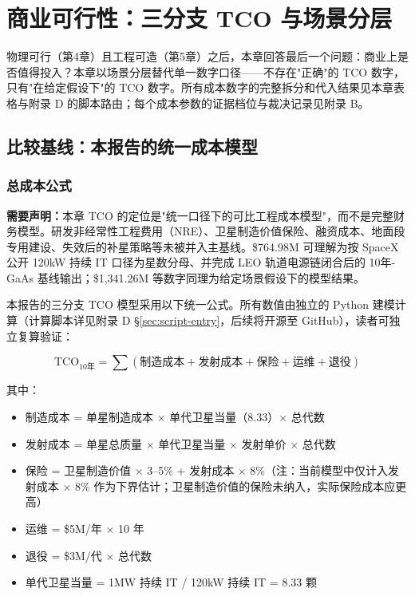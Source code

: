 
\section{商业可行性：三分支 TCO 与场景分层}

物理可行（第4章）且工程可造（第5章）之后，本章回答最后一个问题：商业上是否值得投入？本章以场景分层替代单一数字口径——不存在"正确"的 TCO 数字，只有"在给定假设下"的 TCO 数字。所有成本数字的完整拆分和代入结果见本章表格与附录 D 的脚本路由；每个成本参数的证据档位与裁决记录见附录 B。

\subsection{比较基线：本报告的统一成本模型}

\subsubsection{总成本公式}

\noindent\textbf{需要声明：}本章 TCO 的定位是"统一口径下的可比工程成本模型"，而不是完整财务模型。研发非经常性工程费用（NRE）、卫星制造价值保险、融资成本、地面段专用建设、失效后的补星策略等未被并入主基线。\$764.98M 可理解为按 SpaceX 公开 120kW 持续 IT 口径为星数分母、并完成 LEO 轨道电源链闭合后的 10年-GaAs 基线输出；\$1,341.26M 等数字同理为给定场景假设下的模型结果。

本报告的三分支 TCO 模型采用以下统一公式。所有数值由独立的 Python 建模计算（计算脚本详见附录 D §\ref{sec:script-entry}，后续将开源至 GitHub），读者可独立复算验证：

\begin{equation}
\text{TCO}_{10\text{年}} = \sum \left(\text{制造成本} + \text{发射成本} + \text{保险} + \text{运维} + \text{退役}\right)
\end{equation}

其中：
\begin{itemize}[leftmargin=*]
    \item 制造成本 = 单星制造成本 $\times$ 单代卫星当量（8.33）$\times$ 总代数
    \item 发射成本 = 单星总质量 $\times$ 单代卫星当量 $\times$ 发射单价 $\times$ 总代数
    \item 保险 = 卫星制造价值 $\times$ 3--5\% + 发射成本 $\times$ 8\%（注：当前模型中仅计入发射成本 $\times$ 8\% 作为下界估计；卫星制造价值的保险未纳入，实际保险成本应更高）
    \item 运维 = \$5M/年 $\times$ 10 年
    \item 退役 = \$3M/代 $\times$ 总代数
    \item 单代卫星当量 = 1\;MW 持续 IT / 120\;kW 持续 IT = 8.33 颗
\end{itemize}


